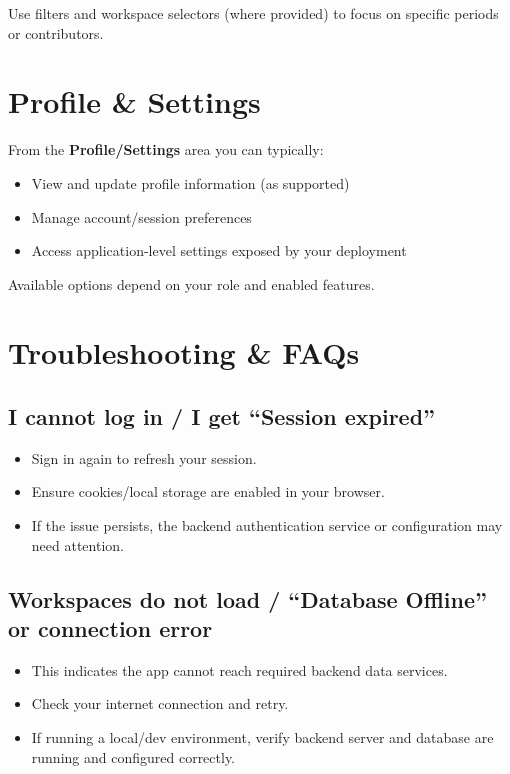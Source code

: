 \documentclass[11pt,a4paper]{article}
\begin{document}
Use filters and workspace selectors (where provided) to focus on specific periods or contributors.

\section{Profile \& Settings}

From the \textbf{Profile/Settings} area you can typically:
\begin{itemize}
  \item View and update profile information (as supported)
  \item Manage account/session preferences
  \item Access application-level settings exposed by your deployment
\end{itemize}

Available options depend on your role and enabled features.

\section{Troubleshooting \& FAQs}

\subsection{I cannot log in / I get ``Session expired''}
\begin{itemize}
  \item Sign in again to refresh your session.
  \item Ensure cookies/local storage are enabled in your browser.
  \item If the issue persists, the backend authentication service or configuration may need attention.
\end{itemize}

\subsection{Workspaces do not load / ``Database Offline'' or connection error}
\begin{itemize}
  \item This indicates the app cannot reach required backend data services.
  \item Check your internet connection and retry.
  \item If running a local/dev environment, verify backend server and database are running and configured correctly.
\end{itemize}
\end{document}
